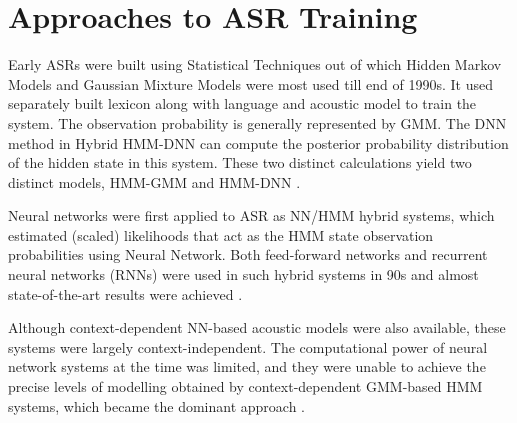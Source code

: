 
\section{Approaches to ASR Training}

Early ASRs were built using Statistical Techniques out of which Hidden Markov Models and Gaussian Mixture Models were most used till end of 1990s. It used separately built lexicon along with language and acoustic model to train the system. The observation probability is generally represented by GMM. The DNN method in Hybrid HMM-DNN can compute the posterior probability distribution of the hidden state in this system. These two distinct calculations yield two distinct models, HMM-GMM and HMM-DNN \cite{backstrom_introduction_2022}.

Neural networks were first applied to ASR as NN/HMM hybrid systems, which estimated (scaled) likelihoods that act as the HMM state observation probabilities using Neural Network. Both feed-forward networks and recurrent neural networks (RNNs) were used in such hybrid systems in 90s and almost state-of-the-art results were achieved \cite{morgan_continuous_1995}. 

Although context-dependent NN-based acoustic models were also available, these systems were largely context-independent. The computational power of neural network systems at the time was limited, and they were unable to achieve the precise levels of modelling obtained by context-dependent GMM-based HMM systems, which became the dominant approach \cite{dahl_context-dependent_2012}. 

